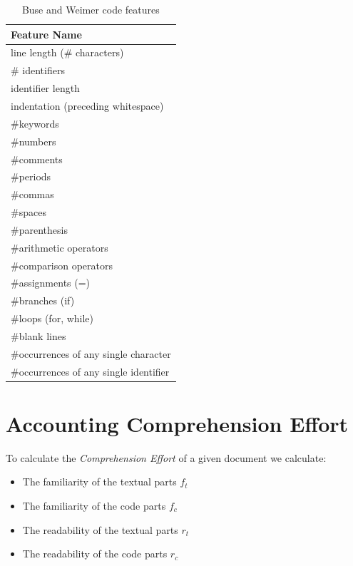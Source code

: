 \documentclass[12pt,mscthesis]{usiinfthesis}
\begin{document}
\begin {table}[H]
	\begin{center}
    \begin{tabular}{ | l | }
    \hline
    \textbf{Feature Name}\\ \hline
	line length (\# characters)\\ \hline
 	\# identifiers\\ \hline
 	identifier length\\ \hline
	indentation (preceding whitespace)\\ \hline
	\#keywords\\ \hline
	 \#numbers\\ \hline
	\#comments\\ \hline
	\#periods\\ \hline
	\#commas\\ \hline
	\#spaces\\ \hline
	\#parenthesis\\ \hline
	 \#arithmetic operators\\ \hline
	 \#comparison operators\\ \hline
	 \#assignments (=)\\ \hline
	 \#branches (if)\\ \hline
	 \#loops (for, while)\\ \hline
	 \#blank lines\\ \hline
	 \#occurrences of any single character\\ \hline
	 \#occurrences of any single identifier\\ \hline
    \end{tabular}
	\end{center}
		\caption{Buse and Weimer code features} \label{tab:Buse and Weimer} 
	\end{table}	


\section{Accounting Comprehension Effort }

To calculate the \emph{Comprehension Effort} of a given document we calculate:
\begin{itemize}
\item The familiarity of the textual parts $f_{t}$ 
\item The familiarity of the code parts $f_{c}$
\item The readability of the textual parts $r_{t}$
\item The readability of the code parts $r_{c}$ 
\end{itemize}
 
\end{document}
